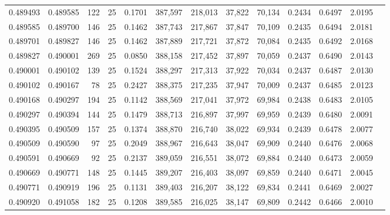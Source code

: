 \begin{tabular}{rrrrrrrrrrrrr}
0.489493 & 0.489585 &   122 &  25 &                                     0.1701 & 387,597 & 218,013 &  37,822 &  70,134 & 0.2434 & 0.6497 & 2.0195 \\
0.489585 & 0.489700 &   146 &  25 &                                     0.1462 & 387,743 & 217,867 &  37,847 &  70,109 & 0.2435 & 0.6494 & 2.0181 \\
0.489701 & 0.489827 &   146 &  25 &                                     0.1462 & 387,889 & 217,721 &  37,872 &  70,084 & 0.2435 & 0.6492 & 2.0168 \\
0.489827 & 0.490001 &   269 &  25 &                                     0.0850 & 388,158 & 217,452 &  37,897 &  70,059 & 0.2437 & 0.6490 & 2.0143 \\
0.490001 & 0.490102 &   139 &  25 &                                     0.1524 & 388,297 & 217,313 &  37,922 &  70,034 & 0.2437 & 0.6487 & 2.0130 \\
0.490102 & 0.490167 &    78 &  25 &                                     0.2427 & 388,375 & 217,235 &  37,947 &  70,009 & 0.2437 & 0.6485 & 2.0123 \\
0.490168 & 0.490297 &   194 &  25 &                                     0.1142 & 388,569 & 217,041 &  37,972 &  69,984 & 0.2438 & 0.6483 & 2.0105 \\
0.490297 & 0.490394 &   144 &  25 &                                     0.1479 & 388,713 & 216,897 &  37,997 &  69,959 & 0.2439 & 0.6480 & 2.0091 \\
0.490395 & 0.490509 &   157 &  25 &                                     0.1374 & 388,870 & 216,740 &  38,022 &  69,934 & 0.2439 & 0.6478 & 2.0077 \\
0.490509 & 0.490590 &    97 &  25 &                                     0.2049 & 388,967 & 216,643 &  38,047 &  69,909 & 0.2440 & 0.6476 & 2.0068 \\
0.490591 & 0.490669 &    92 &  25 &                                     0.2137 & 389,059 & 216,551 &  38,072 &  69,884 & 0.2440 & 0.6473 & 2.0059 \\
0.490669 & 0.490771 &   148 &  25 &                                     0.1445 & 389,207 & 216,403 &  38,097 &  69,859 & 0.2440 & 0.6471 & 2.0045 \\
0.490771 & 0.490919 &   196 &  25 &                                     0.1131 & 389,403 & 216,207 &  38,122 &  69,834 & 0.2441 & 0.6469 & 2.0027 \\
0.490920 & 0.491058 &   182 &  25 &                                     0.1208 & 389,585 & 216,025 &  38,147 &  69,809 & 0.2442 & 0.6466 & 2.0010 \\

\end{tabular}
